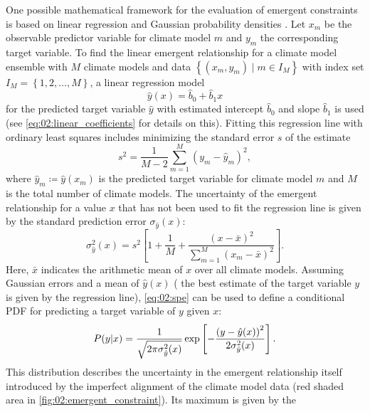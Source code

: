 One possible mathematical framework for the evaluation of emergent constraints
is based on linear regression and Gaussian probability densities
\autocite{Cox2013, Cox2018}. Let $x_m$ be the observable predictor variable for
climate model $m$ and $y_m$ the corresponding target variable. To find the
linear emergent relationship for a climate model ensemble with $M$ climate
models and data $\left\{ \left( x_m, y_m \right) \mid m \in I_M \right\}$ with index set $I_M = \left\{ 1, 2, \ldots, M\right\}$, a linear
regression model
\begin{equation}
  \hat{y}(x) = \hat{b}_0 + \hat{b}_1 x
  \label{eq:02:linear_regression_y}
\end{equation}
for the predicted target variable $\hat{y}$ with estimated intercept
$\hat{b}_0$ and slope $\hat{b}_1$ is used (see \cref{eq:02:linear_coefficients}
for details on this). Fitting this regression line with ordinary least squares
includes minimizing the standard error $s$ of the estimate
\begin{equation}
  s^2 = \frac{1}{M - 2} \sum_{m=1}^M \left( y_m - \hat{y}_m \right)^2,
  \label{eq:02:sse}
\end{equation}
where $\hat{y}_m \coloneq \hat{y}(x_m)$ is the predicted target variable for
climate model $m$ and $M$ is the total number of climate models. The
uncertainty of the emergent relationship for a value $x$ that has not been used
to fit the regression line is given by the standard prediction error
$\sigma_{\hat{y}}(x)$:
\begin{equation}
  \sigma_{\hat{y}}^2(x) = s^2 \left[ 1 + \frac{1}{M} + \frac{\left( x - \bar{x}
    \right)^2}{\sum_{m=1}^M \left( x_m - \bar{x} \right)^2} \right].
  \label{eq:02:spe}
\end{equation}
Here, $\bar{x}$ indicates the arithmetic mean of $x$ over all climate models.
Assuming Gaussian errors and a mean of $\hat{y}(x)$ (\ie{} the best estimate of
the target variable $y$ is given by the regression line), \cref{eq:02:spe} can
be used to define a conditional \acf{PDF} for predicting a target variable of
$y$ given $x$:
\begin{equation}
  P(y|x) = \frac{1}{\sqrt{2 \pi \sigma_{\hat{y}}^2(x)}} \exp \left[
    -\frac{\left( y - \hat{y}(x) \right)^2}{2 \sigma_{\hat{y}}^2(x)} \right].
  \label{eq:02:pdf_y_given_x}
\end{equation}
This distribution describes the uncertainty in the emergent relationship itself
introduced by the imperfect alignment of the climate model data (red shaded
area in \cref{fig:02:emergent_constraint}). Its maximum is given by the
